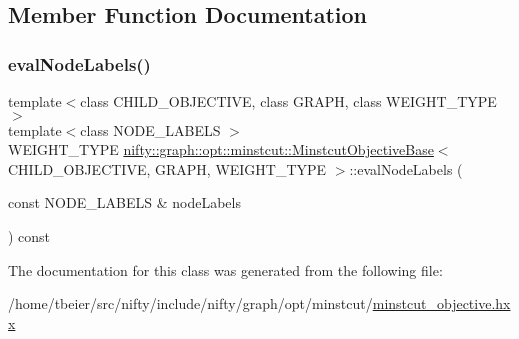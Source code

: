 \subsection{Member Function Documentation}
\mbox{\label{classnifty_1_1graph_1_1opt_1_1minstcut_1_1MinstcutObjectiveBase_a5d1482bf80f2a2dfb416b32fa38fca5e}} 
\subsubsection{\texorpdfstring{eval\+Node\+Labels()}{evalNodeLabels()}}
{\footnotesize\ttfamily template$<$class C\+H\+I\+L\+D\+\_\+\+O\+B\+J\+E\+C\+T\+I\+VE, class G\+R\+A\+PH, class W\+E\+I\+G\+H\+T\+\_\+\+T\+Y\+PE$>$ \\
template$<$class N\+O\+D\+E\+\_\+\+L\+A\+B\+E\+LS $>$ \\
W\+E\+I\+G\+H\+T\+\_\+\+T\+Y\+PE \hyperlink{classnifty_1_1graph_1_1opt_1_1minstcut_1_1MinstcutObjectiveBase}{nifty\+::graph\+::opt\+::minstcut\+::\+Minstcut\+Objective\+Base}$<$ C\+H\+I\+L\+D\+\_\+\+O\+B\+J\+E\+C\+T\+I\+VE, G\+R\+A\+PH, W\+E\+I\+G\+H\+T\+\_\+\+T\+Y\+PE $>$\+::eval\+Node\+Labels (\begin{DoxyParamCaption}\item[{const N\+O\+D\+E\+\_\+\+L\+A\+B\+E\+LS \&}]{node\+Labels }\end{DoxyParamCaption}) const\hspace{0.3cm}{\ttfamily [inline]}}



The documentation for this class was generated from the following file\+:\begin{DoxyCompactItemize}
\item 
/home/tbeier/src/nifty/include/nifty/graph/opt/minstcut/\hyperlink{graph_2opt_2minstcut_2minstcut__objective_8hxx}{minstcut\+\_\+objective.\+hxx}\end{DoxyCompactItemize}
